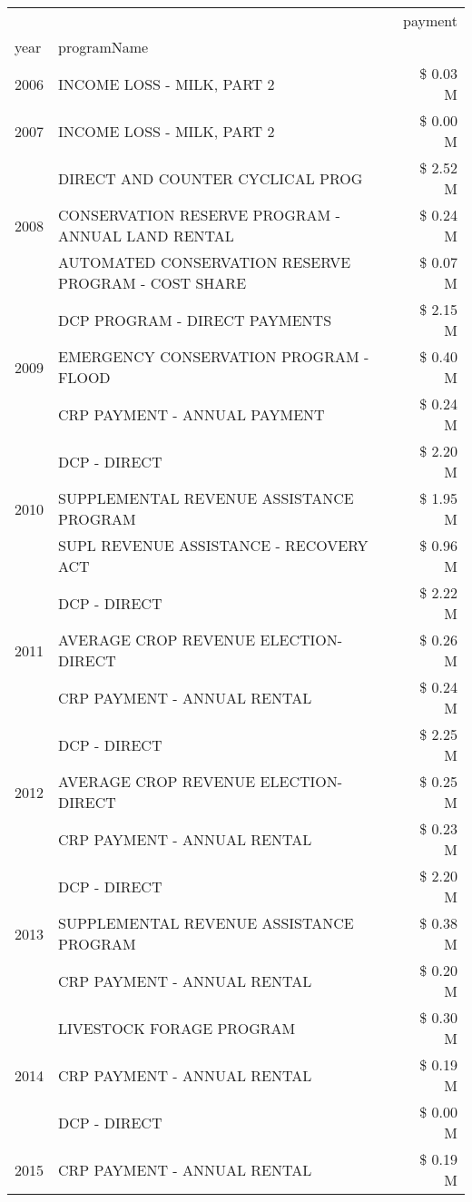 \begin{tabular}{llr}
\toprule
 &  & payment \\
year & programName &  \\
\midrule
2006 & INCOME LOSS - MILK, PART 2 & \$ 0.03 M \\
\cline{1-3}
2007 & INCOME LOSS - MILK, PART 2 & \$ 0.00 M \\
\cline{1-3}
\multirow[t]{3}{*}{2008} & DIRECT AND COUNTER CYCLICAL PROG & \$ 2.52 M \\
 & CONSERVATION RESERVE PROGRAM - ANNUAL LAND RENTAL & \$ 0.24 M \\
 & AUTOMATED CONSERVATION RESERVE PROGRAM - COST SHARE & \$ 0.07 M \\
\cline{1-3}
\multirow[t]{3}{*}{2009} & DCP PROGRAM - DIRECT PAYMENTS & \$ 2.15 M \\
 & EMERGENCY CONSERVATION PROGRAM - FLOOD & \$ 0.40 M \\
 & CRP PAYMENT - ANNUAL PAYMENT & \$ 0.24 M \\
\cline{1-3}
\multirow[t]{3}{*}{2010} & DCP - DIRECT & \$ 2.20 M \\
 & SUPPLEMENTAL REVENUE ASSISTANCE PROGRAM & \$ 1.95 M \\
 & SUPL REVENUE ASSISTANCE - RECOVERY ACT & \$ 0.96 M \\
\cline{1-3}
\multirow[t]{3}{*}{2011} & DCP - DIRECT & \$ 2.22 M \\
 & AVERAGE CROP REVENUE ELECTION-DIRECT & \$ 0.26 M \\
 & CRP PAYMENT - ANNUAL RENTAL & \$ 0.24 M \\
\cline{1-3}
\multirow[t]{3}{*}{2012} & DCP - DIRECT & \$ 2.25 M \\
 & AVERAGE CROP REVENUE ELECTION-DIRECT & \$ 0.25 M \\
 & CRP PAYMENT - ANNUAL RENTAL & \$ 0.23 M \\
\cline{1-3}
\multirow[t]{3}{*}{2013} & DCP - DIRECT & \$ 2.20 M \\
 & SUPPLEMENTAL REVENUE ASSISTANCE PROGRAM & \$ 0.38 M \\
 & CRP PAYMENT - ANNUAL RENTAL & \$ 0.20 M \\
\cline{1-3}
\multirow[t]{3}{*}{2014} & LIVESTOCK FORAGE PROGRAM & \$ 0.30 M \\
 & CRP PAYMENT - ANNUAL RENTAL & \$ 0.19 M \\
 & DCP - DIRECT & \$ 0.00 M \\
\cline{1-3}
\multirow[t]{3}{*}{2015} & CRP PAYMENT - ANNUAL RENTAL & \$ 0.19 M \\

\end{tabular}
